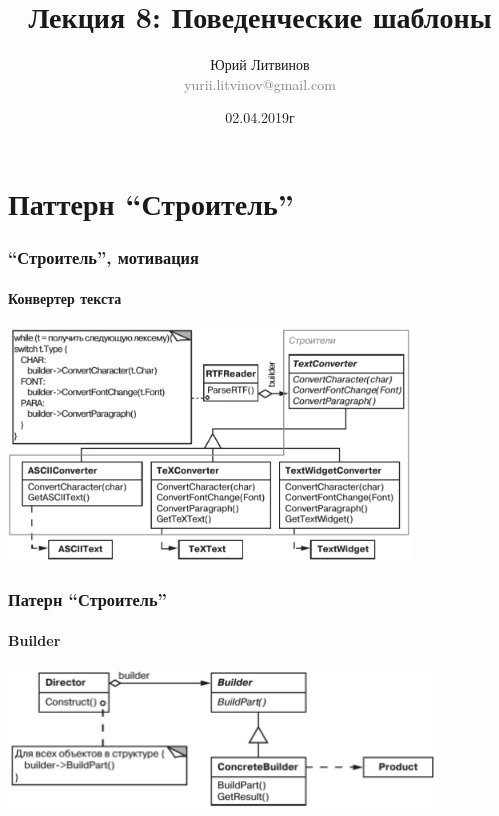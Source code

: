 \documentclass[xetex,mathserif,serif]{beamer}
\title[Шаблоны]{Лекция 8: Поведенческие шаблоны}
\author[Юрий Литвинов]{Юрий Литвинов\\\small{\textcolor{gray}{yurii.litvinov@gmail.com}}}
\date{02.04.2019г}
\begin{document}
	\frame{\titlepage}

	\section{Паттерн ``Строитель''}

	\begin{frame}
		\frametitle{``Строитель'', мотивация}
		\framesubtitle{Конвертер текста}
		\begin{center}
			\includegraphics[width=0.8\textwidth]{textConverter.png}
		\end{center}
	\end{frame}

	\begin{frame}
		\frametitle{Патерн ``Строитель''}
		\framesubtitle{Builder}
		\begin{center}
			\includegraphics[width=0.85\textwidth]{builder.png}
		\end{center}
	\end{frame}
	
\end{document}
